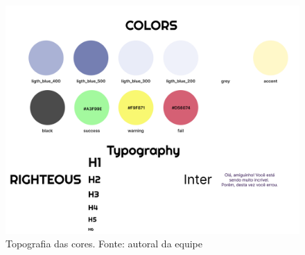\documentclass[12pt, openany, oneside, a4paper, english, brazil]{abntex2}   %
\begin{document}
\begin{figure}[h!]
    \centering
    \includegraphics[width=0.8\linewidth]{figuras/Math.Pow App/Topografia.png}
    \caption{Topografia das cores. Fonte: autoral da equipe}
    \label{fig:Figma}
\end{figure}
\end{document}

